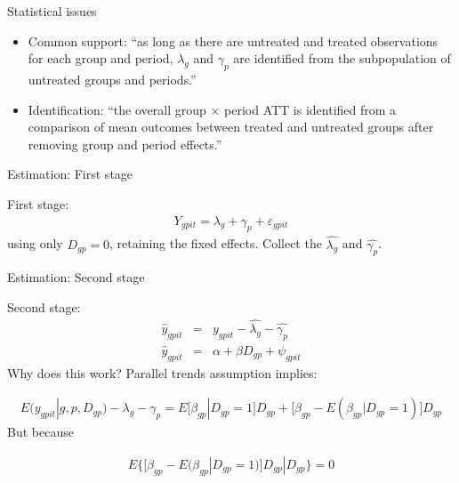 \documentclass{beamer}
\begin{document}
\begin{frame}{Statistical issues}

\begin{itemize}
\item Common support: ``as long as there are untreated and treated observations for each group and period, $\lambda_g$ and $\gamma_p$ are identified from the subpopulation of untreated groups and periods.''
\item Identification: ``the overall group $\times$ period ATT is identified from a comparison of mean outcomes between treated and untreated groups after removing group and period effects.''
\end{itemize}

\end{frame}


\begin{frame}{Estimation: First stage}


First stage:
\begin{eqnarray*}
Y_{gpit} = \lambda_g + \gamma_p + \varepsilon_{gpit}
\end{eqnarray*}using only $D_{gp}=0$, retaining the fixed effects. Collect the $\widehat{\lambda_g}$ and $\widehat{\gamma_p}$.

\end{frame}

\begin{frame}{Estimation: Second stage}

Second stage:
\begin{eqnarray*}
\widehat{y}_{gpit} &=& y_{gpit} - \widehat{\lambda_g} - \widehat{\gamma_p} \\
\widehat{y}_{gpit} &=& \alpha + \beta D_{gp} + \psi_{gpit}
\end{eqnarray*}Why does this work? Parallel trends assumption implies:

\bigskip

\footnotesize
\begin{eqnarray*}
E(y_{gpit} | g,p,D_{gp}) - \lambda_g - \gamma_p = E \bigg [ \beta_{gp} | D_{gp}=1 \bigg ] D_{gp} + \bigg [ \beta_{gp} - E(\beta_{gp} | D_{gp}=1) \bigg ] D_{gp}
\end{eqnarray*}But because

\begin{eqnarray*}
E \bigg \{ [ \beta_{gp} - E( \beta_{gp} | D_{gp} =1) ] D_{gp} | D_{gp} \bigg \} = 0
\end{eqnarray*}


\end{frame}
\end{document}

